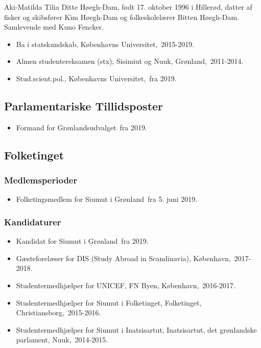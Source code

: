 \documentclass[11pt, a4paper]{awesome-cv}
\begin{document}
\makecvheader[R]
\makelettertitle
\begin{cvletter}
Aki-Matilda Tilia Ditte Høegh-Dam, født 17. oktober 1996 i Hillerød, datter af fisker og skibsfører Kim Høegh-Dam og folkeskolelærer Bitten Høegh-Dam. Samlevende med Kuno Fencker. 

\begin{itemize}
\item Ba i statskundskab, Københavns Universitet, 2015-2019.
\item Almen studentereksamen (stx), Sisimiut og Nuuk, Grønland, 2011-2014.
\item Stud.scient.pol., Københavns Universitet, fra 2019.
\end{itemize}
\subsection*{Parlamentariske Tillidsposter}
\begin{itemize}
\item Formand for Grønlandsudvalget fra 2019.
\end{itemize}
\subsection*{Folketinget}
\subsubsection*{Medlemsperioder}
\begin{itemize}
\item Folketingsmedlem for Siumut i Grønland fra 5. juni 2019.
\end{itemize}
\subsubsection*{Kandidaturer}
\begin{itemize}
\item Kandidat for Siumut i Grønland fra 2019.
\end{itemize}
\begin{itemize}
\item Gæsteforelæser for DIS (Study Abroad in Scandinavia), København, 2017-2018.
\item Studentermedhjælper for UNICEF, FN Byen, København, 2016-2017.
\item Studentermedhjælper for Siumut i Folketinget, Folketinget, Christiansborg, 2015-2016.
\item Studentermedhjælper for Siumut i Inatsisartut, Inatsisartut, det grønlandske parlament, Nuuk, 2014-2015.
\end{itemize}
\end{cvletter}
\end{document}
